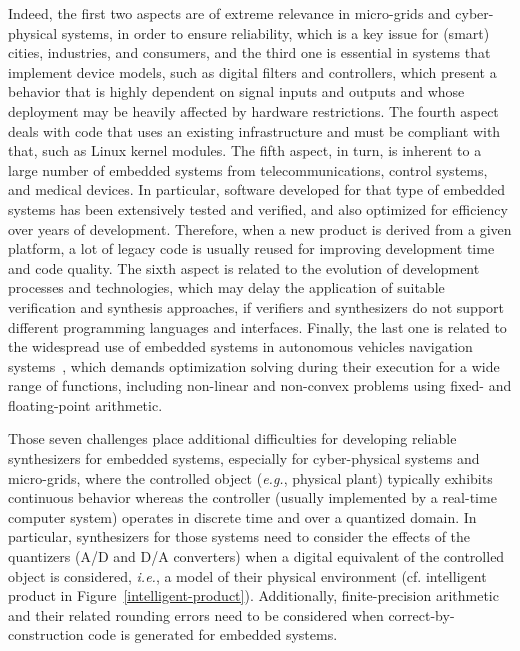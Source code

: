 \documentclass{acm_sen_article}
\begin{document}
Indeed, the first two aspects are of extreme relevance in micro-grids and cyber-physical systems, in order to ensure reliability, which is a key issue for (smart) cities, industries, and consumers, and the third one is essential in systems that implement device models, such as digital filters and controllers, which present a behavior that is highly dependent on signal inputs and outputs and whose deployment may be heavily affected by hardware restrictions. The fourth aspect deals with code that uses an existing infrastructure and must be compliant with that, such as Linux kernel modules. The fifth aspect, in turn, is inherent to a large number of embedded systems from  telecommunications, control systems, and medical devices. In particular, software developed for that type of embedded systems has been extensively tested and verified, and also optimized for efficiency over years of development. Therefore, when a new product is derived from a given platform, a lot of legacy code is usually reused for improving development time and code quality. The sixth aspect is related to the evolution of development processes and technologies, which may delay the application of suitable verification and synthesis approaches, if verifiers and synthesizers do not support different programming languages and interfaces. Finally, the last one is related to the widespread use of embedded systems in autonomous vehicles navigation systems~\cite{Adouane16}, which demands optimization solving during their execution for a wide range of functions, including non-linear and non-convex problems using fixed- and floating-point arithmetic.

Those seven challenges place additional difficulties for developing reliable synthesizers for embedded systems, especially for cyber-physical systems and micro-grids, where the controlled object ({\it e.g.}, physical plant) typically exhibits continuous behavior whereas the controller (usually implemented by a real-time computer system) operates in discrete time and over a quantized domain. In particular, synthesizers for those systems need to consider the effects of the quantizers (A/D and D/A converters) when a digital equivalent of the controlled object is considered, {\it i.e.}, a model of their physical environment (cf. intelligent product in Figure~\ref{intelligent-product}). Additionally,  finite-precision arithmetic and their related rounding errors need to be considered when correct-by-construction code is generated for embedded systems.

\end{document}
